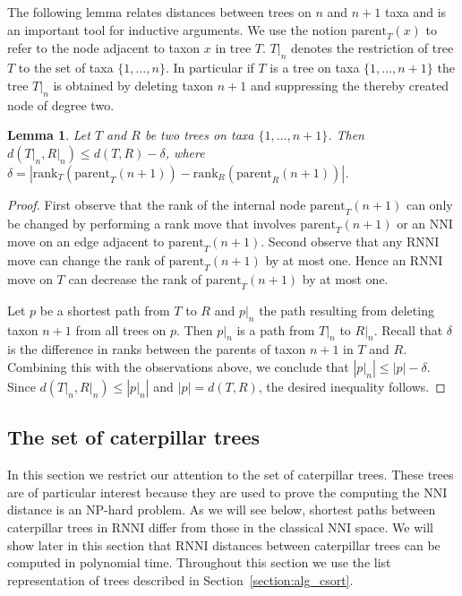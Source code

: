 \documentclass{amsart}
\newcommand{\parent}{\mathrm{parent}}
\newcommand{\rank}{\mathrm{rank}}
\newcommand{\nni}{\mathrm{NNI}}
\newcommand{\rnni}{\mathrm{RNNI}}
\newtheorem{lemma}[definition]{Lemma}
\begin{document}
The following lemma relates distances between trees on $n$ and $n+1$ taxa and is an important tool for inductive arguments.
We use the notion $\parent_T(x)$ to refer to the node adjacent to taxon $x$ in tree $T$.
$T{\big|}_n$ denotes the restriction of tree $T$ to the set of taxa $\{1, \ldots, n\}$.
In particular if $T$ is a tree on taxa $\{1, \ldots, n+1\}$ the tree $T{\big|}_n$ is obtained by deleting taxon $n+1$ and suppressing the thereby created node of degree two.

\begin{lemma}
Let $T$ and $R$ be two trees on taxa $\{1, \ldots, n+1\}$.
Then $d(T{\big|}_n, R{\big|}_n) \leq d(T,R) - \delta$, where $\delta = |\rank_T(\parent_T(n+1)) - \rank_R(\parent_R(n+1))|$.
\label{lemma:distance_delete_taxon}
\end{lemma}

\begin{proof}
First observe that the rank of the internal node $\parent_T(n+1)$ can only be changed by performing a rank move that involves $\parent_T(n+1)$ or an $\nni$ move on an edge adjacent to $\parent_T(n+1)$.
Second observe that any $\rnni$ move can change the rank of $\parent_T(n+1)$ by at most one.
Hence an $\rnni$ move on $T$ can decrease the rank of $\parent_T(n+1)$ by at most one.

Let $p$ be a shortest path from $T$ to $R$ and $p{\big|}_n$ the path resulting from deleting taxon $n+1$ from all trees on $p$.
Then $p{\big|}_n$ is a path from $T{\big|}_n$ to $R{\big|}_n$.
Recall that $\delta$ is the difference in ranks between the parents of taxon $n+1$ in $T$ and $R$.
Combining this with the observations above, we conclude that $|p{\big|}_n| \leq |p| - \delta$.
Since $d(T{\big|}_n,R{\big|}_n) \leq |p{\big|}_n|$ and $|p| = d(T,R)$, the desired inequality follows.
\end{proof}


\subsection{The set of caterpillar trees}
\label{section:caterpillar_convex}

In this section we restrict our attention to the set of caterpillar trees.
These trees are of particular interest because they are used to prove the computing the $\nni$ distance is an NP-hard problem.
As we will see below, shortest paths between caterpillar trees in $\rnni$ differ from those in the classical $\nni$ space.
We will show later in this section that $\rnni$ distances between caterpillar trees can be computed in polynomial time.
Throughout this section we use the list representation of trees described in Section~\ref{section:alg_csort}.
\end{document}
